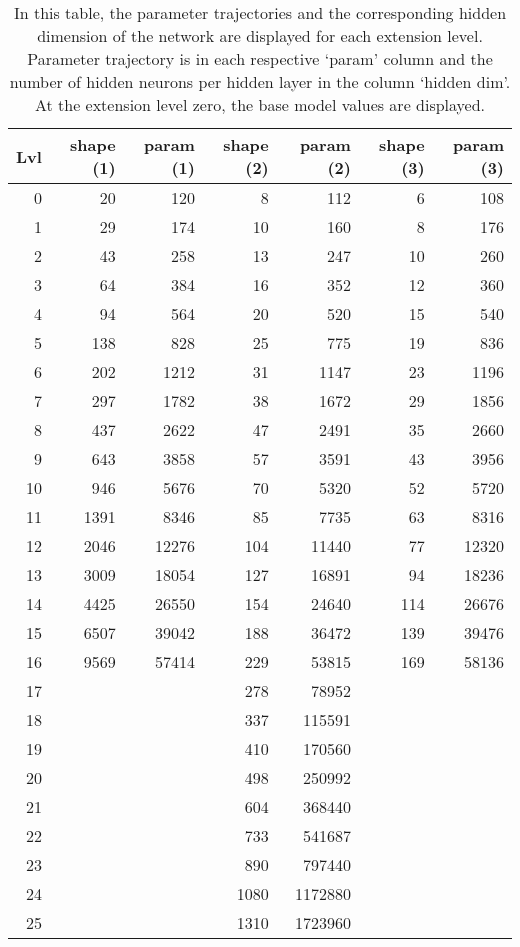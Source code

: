 \begin{table}[ht]
    {
    \sffamily
    \caption{
    In this table, the parameter trajectories and the corresponding hidden dimension of the network are displayed for each extension level. 
    Parameter trajectory is in each respective `param' column and the number of hidden neurons per hidden layer in the column `hidden dim'.
    At the extension level zero, the base model values are displayed.
    }\label{tab:trajectory}
    \begin{tabular}{rrrrrrr}
    \toprule
    Lvl & shape (1) & param (1) & shape (2) & param (2) & shape (3) & param (3) \\
    \midrule
    0 & 20 & 120 & 8 & 112 & 6 & 108 \\
    1 & 29 & 174 & 10 & 160 & 8 & 176 \\
    2 & 43 & 258 & 13 & 247 & 10 & 260 \\
    3 & 64 & 384 & 16 & 352 & 12 & 360 \\
    4 & 94 & 564 & 20 & 520 & 15 & 540 \\
    5 & 138 & 828 & 25 & 775 & 19 & 836 \\
    6 & 202 & 1212 & 31 & 1147 & 23 & 1196 \\
    7 & 297 & 1782 & 38 & 1672 & 29 & 1856 \\
    8 & 437 & 2622 & 47 & 2491 & 35 & 2660 \\
    9 & 643 & 3858 & 57 & 3591 & 43 & 3956 \\
    10 & 946 & 5676 & 70 & 5320 & 52 & 5720 \\
    11 & 1391 & 8346 & 85 & 7735 & 63 & 8316 \\
    12 & 2046 & 12276 & 104 & 11440 & 77 & 12320 \\
    13 & 3009 & 18054 & 127 & 16891 & 94 & 18236 \\
    14 & 4425 & 26550 & 154 & 24640 & 114 & 26676 \\
    15 & 6507 & 39042 & 188 & 36472 & 139 & 39476 \\
    16 & 9569 & 57414 & 229 & 53815 & 169 & 58136 \\
    17 &   &   & 278 & 78952 &   &   \\
    18 &   &   & 337 & 115591 &   &   \\
    19 &   &   & 410 & 170560 &   &   \\
    20 &   &   & 498 & 250992 &   &   \\
    21 &   &   & 604 & 368440 &   &   \\
    22 &   &   & 733 & 541687 &   &   \\
    23 &   &   & 890 & 797440 &   &   \\
    24 &   &   & 1080 & 1172880 &   &   \\
    25 &   &   & 1310 & 1723960 &   &   \\
    \bottomrule
    \end{tabular}
    }
\end{table}

